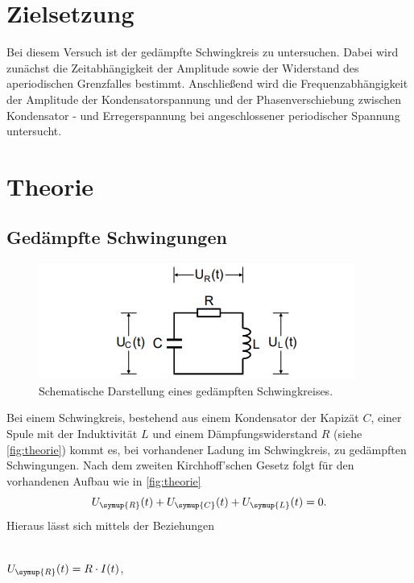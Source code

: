 \section{Zielsetzung}
    Bei diesem Versuch ist der gedämpfte Schwingkreis zu untersuchen. Dabei wird zunächst die Zeitabhängigkeit der Amplitude sowie
    der Widerstand des aperiodischen Grenzfalles bestimmt. Anschließend wird die Frequenzabhängigkeit der Amplitude der Kondensatorspannung
    und der Phasenverschiebung zwischen Kondensator - und Erregerspannung bei angeschlossener periodischer Spannung untersucht.
\section{Theorie}
    \label{sec:Theorie}
    \subsection{Gedämpfte Schwingungen}
        \begin{figure}
            \centering
            \includegraphics[width=\textwidth]{content/theorie.png}
            \caption{Schematische Darstellung eines gedämpften Schwingkreises\cite[284]{V354}.}
            \label{fig:theorie}
        \end{figure} 
        Bei einem Schwingkreis, bestehend aus einem Kondensator der Kapizät $C$, einer Spule mit der Induktivität $L$
        und einem Dämpfungswiderstand $R$ (siehe \autoref{fig:theorie}) kommt es, bei vorhandener Ladung im Schwingkreis, zu gedämpften 
        Schwingungen. Nach dem zweiten Kirchhoff'schen Gesetz folgt für den vorhandenen Aufbau wie in \autoref{fig:theorie}
        \begin{equation}
            \label{eqn:kirchhoff}
            U_{\symup{R}}(t) + U_{\symup{C}}(t) + U_{\symup{L}}(t) = 0.
        \end{equation}
        Hieraus lässt sich mittels der Beziehungen
        \\ \\
        \centerline{$U_{\symup{R}}(t) = R \cdot I(t)$,}
